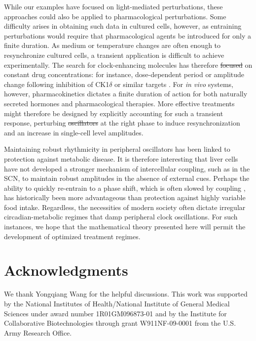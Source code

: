 \documentclass[11pt, letterpaper]{article}
\providecommand{\DIFadd}[1]{{\protect\color{blue}\uwave{#1}}} %
\providecommand{\DIFdel}[1]{{\protect\color{red}\sout{#1}}}                      %
\providecommand{\DIFaddbegin}{} %
\providecommand{\DIFaddend}{} %
\providecommand{\DIFdelbegin}{} %
\providecommand{\DIFdelend}{} %
\begin{document}
While our examples have focused on light-mediated perturbations, these
approaches could also be applied to pharmacological perturbations. Some
difficulty arises in obtaining such data in cultured cells, however, as
entraining perturbations would require that pharmacological agents be introduced
for only a finite duration. As medium or temperature changes are often enough to
resynchronize cultured cells, a transient application is difficult to achieve
experimentally. The search for clock-enhancing molecules has therefore \DIFdelbegin \DIFdel{focused
}\DIFdelend \DIFaddbegin \DIFadd{tended to focus
}\DIFaddend on constant drug concentrations: for instance, dose-dependent period or
amplitude change following inhibition of CK1$\delta$ or similar targets
\cite{Chen2013}. For {\itshape in vivo} systems, however, pharmacokinetics
dictates a finite duration of action for both naturally secreted hormones and
pharmacological therapies. More effective treatments might therefore be designed
by explicitly accounting for such a transient response, perturbing \DIFdelbegin \DIFdel{oscillators
}\DIFdelend \DIFaddbegin \DIFadd{peripheral clocks
}\DIFaddend at the right phase to induce resynchronization and an increase in single-cell
level amplitudes.

Maintaining robust rhythmicity in peripheral oscillators has been linked to
protection against metabolic disease. It is therefore interesting that liver
cells have not developed a stronger mechanism of intercellular coupling, such as
in the SCN, to maintain robust amplitudes in the absence of external cues.
Perhaps the ability to quickly re-entrain to a phase shift, which is often
slowed by coupling \cite{Abraham2010}, has historically been more advantageous
than protection against highly variable food intake. Regardless, the necessities
of modern society often dictate irregular circadian-metabolic regimes that damp
peripheral clock oscillations. For such instances, we hope that the mathematical
theory presented here will permit the development of optimized treatment
regimes.

\section*{Acknowledgments}
We thank Yongqiang Wang for the helpful discussions. This work was supported by
the National Institutes of Health/National Institute of General Medical Sciences
under award number 1R01GM096873-01 and by the Institute for Collaborative
Biotechnologies through grant W911NF-09-0001 from the U.S. Army Research Office. 



\end{document}
